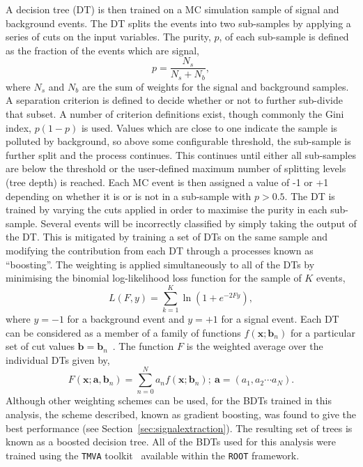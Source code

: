 A decision tree (DT) is then trained on a MC simulation sample of signal and background 
events. The DT splits the events into two sub-samples by applying a series of cuts
on the input variables. The purity, $p$, of each sub-sample is defined as 
the fraction of the events which are signal, 
\begin{equation}
p = \frac{N_{s}}{N_{s}+N_{b}},
\end{equation}
where $N_{s}$ and $N_{b}$ are the sum of weights for the signal and background samples.
A separation criterion is defined to decide whether or not to further sub-divide
that subset. A number of criterion definitions exist, though commonly the 
Gini index, $p(1-p)$ is used. Values which are close to one indicate 
the sample is polluted by background, so above some configurable threshold, 
the sub-sample is further split and the process continues. 
This continues until either all sub-samples are below the threshold or the
user-defined maximum number of splitting levels (tree depth) is reached. 
Each MC event is then assigned a value of -1 or +1 depending on whether it is
or is not in a sub-sample with $p>0.5$. The DT is trained by varying the cuts 
applied in order to maximise the purity in each sub-sample.
Several events will be incorrectly classified by simply taking the output of the DT.
This is mitigated by training a set of DTs on the same sample and modifying the 
contribution from each DT through a processes known as ``boosting''. 
The weighting is applied simultaneously to all of the DTs by minimising the 
binomial log-likelihood loss function for the sample of $K$ events,
\begin{equation}
L(F,y) = \sum_{k=1}^{K} \ln\left(1+e^{-2 Fy} \right),
\end{equation}
where $y=-1$ for a background event and $y=+1$ for a signal event.
Each DT can be considered as a member of a family of functions $f(\mathbf{x};\mathbf{b}_{n})$ 
for a particular set of cut values $\mathbf{b}=\mathbf{b}_{n}$~\citep{friedmanbdt}.
The function $F$ is the weighted average over the individual DTs given by,
\begin{equation}
F(\mathbf{x};\mathbf{a},\mathbf{b}_{n}) = 
	\sum_{n=0}^{N}a_{n}f(\mathbf{x};\mathbf{b}_{n});~\mathbf{a}=(a_{1},a_{2}\cdots a_{N}).
\end{equation}
Although other weighting schemes can be used, for the BDTs trained in this analysis, 
the scheme described, known as gradient boosting, was found to give the best performance 
(see Section~\ref{sec:signalextraction}).
The resulting set of trees is known as a boosted decision tree. 
All of the BDTs used for this analysis were trained using the \texttt{TMVA} 
toolkit~\citep{tmva} available within the \texttt{ROOT} framework.
